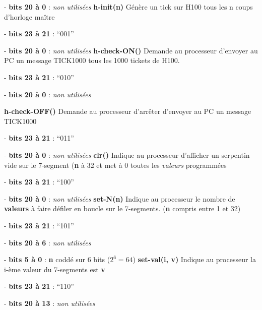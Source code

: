 \documentclass[10pt]{article}
\begin{document}
        - \textbf{bits 20 à 0} : \textit{non utilisées}
        \newline
        \newline
        \textbf{h-init(n)} Génère un tick sur H100 tous les n coups d'horloge maître
        
        - \textbf{bits 23 à 21} : ``001''

        - \textbf{bits 20 à 0} : \textit{non utilisées}
        \newline
        \newline
        \textbf{h-check-ON()} Demande au processeur d'envoyer au PC un message TICK1000 tous les 1000 tickets de H100.
        
        - \textbf{bits 23 à 21} : ``010''

        - \textbf{bits 20 à 0} : \textit{non utilisées}

        \textbf{h-check-OFF()} Demande au processeur d'arrêter d'envoyer au PC un message TICK1000
        
        - \textbf{bits 23 à 21} : ``011''

        - \textbf{bits 20 à 0} : \textit{non utilisées}
        \newline
        \newline
        \textbf{clr()} Indique au processeur d'afficher un serpentin vide sur le 7-segment (\textbf{n} à 32 et met à 0 toutes les \textit{valeurs} programmées
        
        - \textbf{bits 23 à 21} : ``100''

        - \textbf{bits 20 à 0} : \textit{non utilisées}
        \newline
        \newline
        \textbf{set-N(n)} Indique au processeur le nombre de \textbf{valeurs} à faire défiler en boucle sur le 7-segments. (\textbf{n} compris entre 1 et 32)\label{N}
        
        - \textbf{bits 23 à 21} : ``101''

        - \textbf{bits 20 à 6} : \textit{non utilisées} 

        - \textbf{bits 5 à 0} : \textbf{n} coddé sur 6 bits ($2^6 = 64$)
        \newline
        \newline
        \textbf{set-val(i, v)} Indique au processeur la i-ème valeur du 7-segments est \textbf{v}
        
        - \textbf{bits 23 à 21} : ``110''

        - \textbf{bits 20 à 13} : \textit{non utilisées} 
\end{document}
